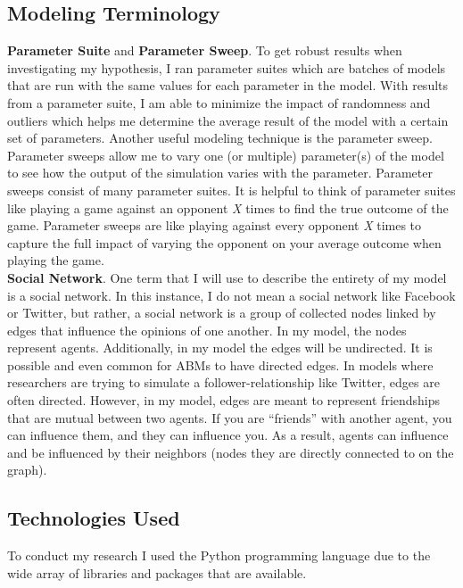 \subsection{Modeling Terminology}

\textbf{Parameter Suite} and \textbf{Parameter Sweep}. To get robust results when investigating my hypothesis, I ran parameter suites which are batches of models that are run with the same values for each parameter in the model. With results from a parameter suite, I am able to minimize the impact of randomness and outliers which helps me determine the average result of the model with a certain set of parameters. Another useful modeling technique is the parameter sweep. Parameter sweeps allow me to vary one (or multiple) parameter(s) of the model to see how the output of the simulation varies with the parameter. Parameter sweeps consist of many parameter suites. It is helpful to think of parameter suites like playing a game against an opponent \textit{X} times to find the true outcome of the game. Parameter sweeps are like playing against every opponent \textit{X} times to capture the full impact of varying the opponent on your average outcome when playing the game.\\

\textbf{Social Network}. One term that I will use to describe the entirety of my model is a social network. In this instance, I do not mean a social network like Facebook or Twitter, but rather, a social network is a group of collected nodes linked by edges that influence the opinions of one another. In my model, the nodes represent agents. Additionally, in my model the edges will be undirected. It is possible and even common for ABMs to have directed edges. In models where researchers are trying to simulate a follower-relationship like Twitter, edges are often directed. However, in my model, edges are meant to represent friendships that are mutual between two agents. If you are ``friends'' with another agent, you can influence them, and they can influence you. As a result, agents can influence and be influenced by their neighbors (nodes they are directly connected to on the graph). 

\subsection{Technologies Used}
To conduct my research I used the Python programming language due to the wide array of libraries and packages that are available. 

